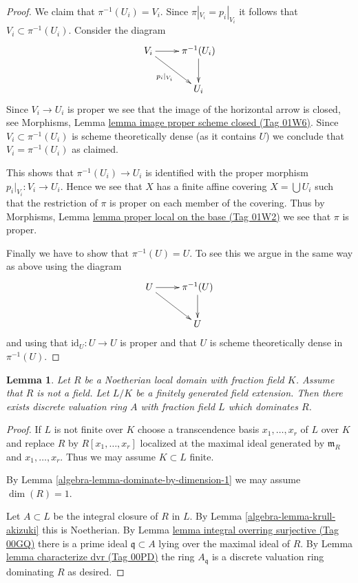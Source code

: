 \documentclass{amsart}
\theoremstyle{plain}
\newtheorem{lemma}[subsection]{Lemma}
\theoremstyle{definition}
\theoremstyle{remark}
\numberwithin{equation}{subsection}
\begin{document}
\begin{proof}
\medskip\noindent
We claim that $\pi^{-1}(U_i) = V_i$.
Since $\pi|_{V_i} = p_i|_{V_i}$ it follows that
$V_i \subset \pi^{-1}(U_i)$. Consider the diagram
$$
\xymatrix{
V_i \ar[r] \ar[rd]_{p_i|_{V_i}} & \pi^{-1}(U_i) \ar[d] \\
& U_i
}
$$
Since $V_i \to U_i$ is proper we see that the image of
the horizontal arrow is closed, see
Morphisms, Lemma \href{https://stacks.math.columbia.edu/tag/01W6}{lemma image proper scheme closed (Tag 01W6)}.
Since $V_i \subset \pi^{-1}(U_i)$ is scheme
theoretically dense (as it contains $U$)
we conclude that $V_i = \pi^{-1}(U_i)$ as claimed.

\medskip\noindent
This shows that $\pi^{-1}(U_i) \to U_i$ is identified with the proper
morphism $p_i|_{V_i} : V_i \to U_i$. Hence we see that $X$ has a
finite affine covering $X = \bigcup U_i$ such that the restriction
of $\pi$ is proper on each member of the covering.
Thus by Morphisms, Lemma \href{https://stacks.math.columbia.edu/tag/01W2}{lemma proper local on the base (Tag 01W2)}
we see that $\pi$ is proper.

\medskip\noindent
Finally we have to show that $\pi^{-1}(U) = U$. To see this we argue in the
same way as above using the diagram
$$
\xymatrix{
U \ar[r] \ar[rd] & \pi^{-1}(U) \ar[d] \\
& U
}
$$
and using that $\text{id}_U : U \to U$ is proper and that
$U$ is scheme theoretically dense in $\pi^{-1}(U)$.
\end{proof}


\begin{lemma}
\label{algebra-lemma-exists-dvr}
Let $R$ be a Noetherian local domain with fraction field $K$.
Assume that $R$ is not a field.
Let $L/K$ be a finitely generated field extension.
Then there exists discrete valuation ring $A$ with fraction field
$L$ which dominates $R$.
\end{lemma}

\begin{proof}
If $L$ is not finite over $K$ choose a transcendence basis
$x_1, \ldots, x_r$ of $L$ over $K$ and replace $R$ by
$R[x_1, \ldots, x_r]$ localized at the maximal ideal
generated by $\mathfrak m_R$ and $x_1, \ldots, x_r$.
Thus we may assume $K \subset L$ finite.

\medskip\noindent
By Lemma \ref{algebra-lemma-dominate-by-dimension-1} we may assume $\dim(R) = 1$.

\medskip\noindent
Let $A \subset L$ be the integral closure of $R$ in $L$.
By Lemma \ref{algebra-lemma-krull-akizuki} this is Noetherian.
By Lemma \href{https://stacks.math.columbia.edu/tag/00GQ}{lemma integral overring surjective (Tag 00GQ)} there
is a prime ideal $\mathfrak q \subset A$ lying
over the maximal ideal of $R$.
By Lemma \href{https://stacks.math.columbia.edu/tag/00PD}{lemma characterize dvr (Tag 00PD)} the ring $A_{\mathfrak q}$ is a discrete
valuation ring dominating $R$ as desired.
\end{proof}
\end{document}
